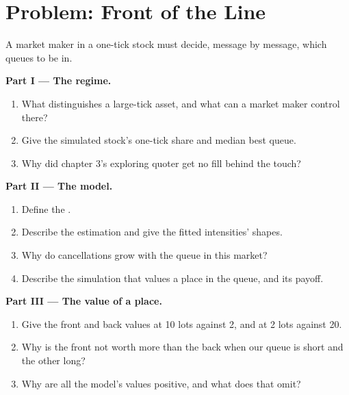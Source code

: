 \section{Problem: Front of the Line}

\begin{problem}\label{pb:hf:queue-reactive-models-and-large-tick-assets:1}
A market maker in a one-tick stock must decide, message by message, which queues to be in.

\medskip\noindent\textbf{Part I --- The regime.}
\begin{enumerate}
\item What distinguishes a large-tick asset, and what can a market maker control there?
\item Give the simulated stock's one-tick share and median best queue.
\item Why did chapter 3's exploring quoter get no fill behind the touch?
\end{enumerate}

\medskip\noindent\textbf{Part II --- The model.}
\begin{enumerate}[resume]
\item Define the .
\item Describe the estimation and give the fitted intensities' shapes.
\item Why do cancellations grow with the queue in this market?
\item Describe the simulation that values a place in the queue, and its payoff.
\end{enumerate}

\medskip\noindent\textbf{Part III --- The value of a place.}
\begin{enumerate}[resume]
\item Give the front and back values at 10 lots against 2, and at 2 lots against 20.
\item Why is the front not worth more than the back when our queue is short and the other long?
\item Why are all the model's values positive, and what does that omit?
\end{enumerate}


\end{problem}
